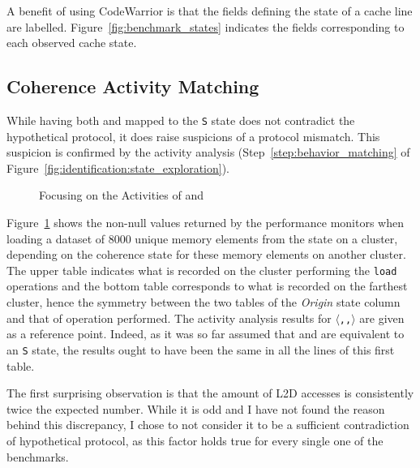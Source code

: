 A benefit of using CodeWarrior is that the fields defining the state of a cache
line are labelled. Figure~\ref{fig:benchmark_states} indicates the fields
corresponding to each observed cache state.

\subsection{Coherence Activity Matching}
While having both \benchx{} and \benchs{} mapped to the \texttt{S} state does
not contradict the hypothetical protocol, it does raise suspicions of a
protocol mismatch. This suspicion is confirmed by the activity analysis
(Step~\ref{step:behavior_matching} of
Figure~\ref{fig:identification:state_exploration}).

\begin{figure}[hbt!]
\begin{center}

\end{center}
\caption{Focusing on the Activities of \benchs{} and \benchx{}}
\label{fig:unexpected_behaviors}
\end{figure}

Figure~\ref{fig:unexpected_behaviors} shows the non-null values returned by the
performance monitors when loading a dataset of 8000 unique memory elements from
the \benchi{} state on a cluster, depending on the coherence state for these
memory elements on another cluster. The upper table indicates what is recorded
on the cluster performing the \texttt{load} operations and the bottom table
corresponds to what is recorded on the farthest cluster, hence the symmetry
between the two tables of the \textit{Origin} state column and that of operation
performed. The activity analysis results for
\texttt{$\langle$\benchi{},\benchi{},\benchi{}$\rangle$} are given as a reference
point. Indeed, as it was so far assumed that \benchx{} and \benchs{} are
equivalent to an \texttt{S} state, the results ought to have been the same in
all the lines of this first table.

The first surprising observation is that the amount of L2D accesses is
consistently twice the expected number. While it is odd and I have not found the
reason behind this discrepancy, I chose to not consider it to be a sufficient
contradiction of hypothetical protocol, as this factor holds true for every
single one of the benchmarks.


